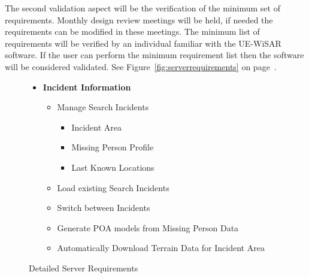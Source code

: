 \documentclass[12pt]{IEEEtran}
\begin{document}
The second validation aspect will be the verification of the minimum set of
requirements.  Monthly design review meetings will be held, if needed the
requirements can be modified in these meetings.  The minimum list of
requirements will be verified by an individual familiar with the UE-WiSAR
software.  If the user can perform the minimum requirement list then the
software will be considered validated.  See Figure~\ref{fig:serverrequirements}
on page~\pageref{fig:serverrequirements}.

\begin{figure}[htp]
	\caption{Detailed Server Requirements}
	\begin{itemize}
		\item \textbf{Incident Information}
		\begin{itemize}
		  	\item Manage Search Incidents
		  	\begin{itemize}
			  	  \item Incident Area
			  	  \item Missing Person Profile
			  	  \item Last Known Locations
	  	  	\end{itemize}
	  	  	\item Load existing Search Incidents
	  	  	\item Switch between Incidents
	  	  	\item Generate POA models from Missing Person Data
	  	  	\item Automatically Download Terrain Data for Incident Area
		\end{itemize}
		

\end{itemize}
\end{figure}
\end{document}
